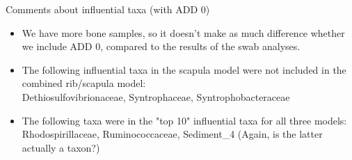 \documentclass{beamer}
\begin{document}
\begin{frame}{Comments about influential taxa (with ADD 0)}
  
  \begin{itemize}
    \item We have more bone samples, so it doesn't make as much difference
    whether we include ADD 0, compared to the results of the swab analyses.
    \item The following influential taxa in the scapula model were not included
    in the combined rib/scapula model:\\
    Dethiosulfovibrionaceae, Syntrophaceae, Syntrophobacteraceae
    \item The following taxa were in the "top 10" influential taxa for all
    three models:\\
    Rhodospirillaceae, Ruminococcaceae, Sediment\_4 \quad (Again, is the latter actually a taxon?) 
  \end{itemize}

\end{frame}
\end{document}
